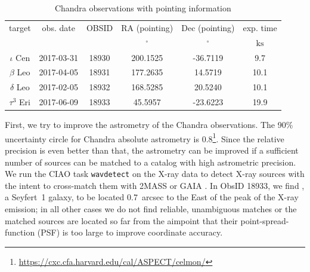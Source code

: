 \documentclass[preprint2]{aastex631}
\begin{document}
\begin{table}
\caption{Chandra observations with pointing information \label{tab:obslog}}
\begin{tabular}{cccccc}
\hline \hline
target & obs. date & OBSID & RA (pointing) & Dec (pointing) & exp. time \\
 &  &  & $\mathrm{{}^{\circ}}$ & $\mathrm{{}^{\circ}}$ & $\mathrm{ks}$ \\
\hline
$\iota$ Cen & 2017-03-31 & 18930 & 200.1525 & -36.7119 & 9.7 \\
$\beta$ Leo & 2017-04-05 & 18931 & 177.2635 & 14.5719 & 10.1 \\
$\delta$ Leo & 2017-02-05 & 18932 & 168.5285 & 20.5240 & 10.1 \\
$\tau^3$ Eri & 2017-06-09 & 18933 & 45.5957 & -23.6223 & 19.9 \\
\hline
\end{tabular}
\end{table}
First, we try to improve the astrometry of the Chandra observations.
The 90\% uncertainty circle for Chandra absolute astrometry is
0.8\arcsec\footnote{\url{https://cxc.cfa.harvard.edu/cal/ASPECT/celmon/}}. Since
the relative precision is even better than that, the astrometry can be
improved if a sufficient number of sources can be matched to a catalog
with high astrometric precision. We run the CIAO task \texttt{wavdetect} on the
X-ray data to detect X-ray sources with the intent to cross-match them
with 2MASS \citep{2006AJ....131.1163S} or GAIA
\citep{2016A&A...595A...1G,2018A&A...616A...1G}.
In ObsID 18933, we find , a Seyfert~1 galaxy, to be located 0.7~arcsec to the East of the peak of the X-ray emission; in all other cases we do not find reliable, unambiguous matches or the matched sources are located so far from the aimpoint that their point-spread-function (PSF) is too large to improve coordinate accuracy.
\end{document}

